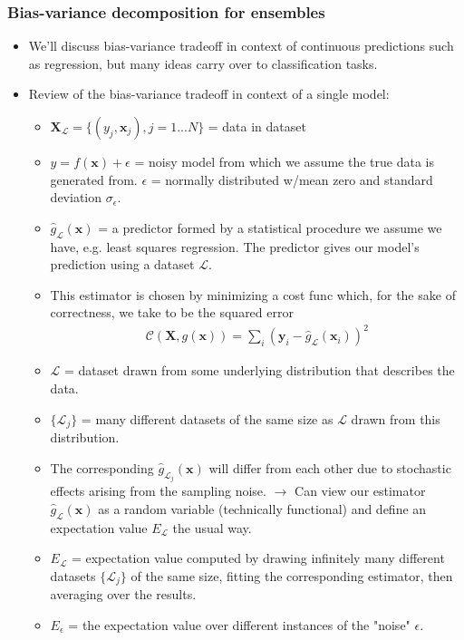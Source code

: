 \documentclass[norsk,a4paper,11pt]{article}
\begin{document}
\subsubsection{Bias-variance decomposition for ensembles}
\begin{itemize}
	\item We'll discuss bias-variance tradeoff in context of continuous predictions such as regression, but many ideas carry over to classification tasks.
	\item Review of the bias-variance tradeoff in context of a single model:
	\begin{itemize}
		\item $\bm{X}_\mathcal{L} = \{ (y_j , \bm{x}_j), j=1...N \}$ = data in dataset
		\item $y= f(\bm{x}) + \epsilon$ = noisy model from which we assume the true data is generated from. $\epsilon$ = normally distributed w/mean zero and standard deviation $\sigma_\epsilon$. 
		\item $\hat{g}_\mathcal{L} (\bm{x})$ = a predictor formed by a statistical procedure we assume we have, e.g. least squares regression. The predictor gives our model's prediction using a dataset $\mathcal{L}$. 
		\item This estimator is chosen by minimizing a cost func which, for the sake of correctness, we take to be the squared error
		\begin{align}
			\mathcal{C} (\bm{X}, g(\bm{x})) = \sum_i (\bm{y}_i - \hat{g}_\mathcal{L} (\bm{x}_i))^2
		\end{align}
		\item $\mathcal{L}$ = dataset drawn from some underlying distribution that describes the data.
		\item $\{ \mathcal{L}_j \}$ = many different datasets of the same size as $\mathcal{L}$ drawn from this distribution.
		\item The corresponding $\hat{g}_{\mathcal{L}_j} (\bm{x})$ will differ from each other due to stochastic effects arising from the sampling noise. $\rightarrow$ Can view our estimator $\hat{g}_\mathcal{L} (\bm{x})$ as a random variable (technically functional) and define an expectation value $E_\mathcal{L}$ the usual way.
		\item $E_\mathcal{L}$ = expectation value computed by drawing infinitely many different datasets $\{ \mathcal{L}_j \}$ of the same size, fitting the corresponding estimator, then averaging over the results. 
		\item $E_\epsilon$ = the expectation value over different instances of the "noise" $\epsilon$.

\end{itemize}
\end{itemize}
\end{document}
